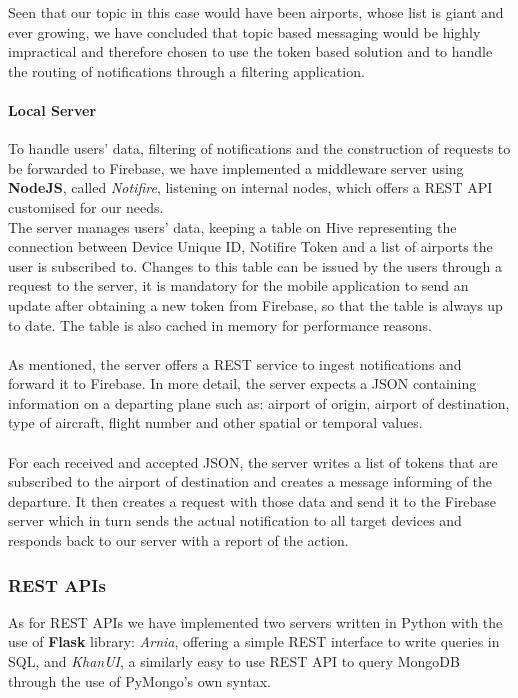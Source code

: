 Seen that our topic in this case would have been airports, whose list is giant and ever growing, we have concluded that topic based messaging would be highly impractical and therefore chosen to use the token based solution and to handle the routing of notifications through a filtering application.

\paragraph{Local Server}
To handle users' data, filtering of notifications and the construction of requests to be forwarded to Firebase, we have implemented a middleware server using \textbf{NodeJS}, called \textit{Notifire}, listening on internal nodes, which offers a REST API customised for our needs.
\\
The server manages users' data, keeping a table on Hive representing the connection between Device Unique ID, Notifire Token and a list of airports the user is subscribed to. Changes to this table can be issued by the users through a request to the server, it is mandatory for the mobile application to send an update after obtaining a new token from Firebase, so that the table is always up to date.
The table is also cached in memory for performance reasons.
\\ \\
As mentioned, the server offers a REST service to ingest notifications and forward it to Firebase. In more detail, the server expects a JSON containing information on a departing plane such as: airport of origin, airport of destination, type of aircraft, flight number and other spatial or temporal values.
\\ \\
For each received and accepted JSON, the server writes a list of tokens that are subscribed to the airport of destination and creates a message informing of the departure. It then creates a request with those data and send it to the Firebase server which in turn sends the actual notification to all target devices and responds back to our server with a report of the action.

\subsubsection{REST APIs}
As for REST APIs we have implemented two servers written in Python with the use of \textbf{Flask} library: \textit{Arnia}, offering a simple REST interface to write queries in SQL, and \textit{KhanUI}, a similarly easy to use REST API to query MongoDB through the use of PyMongo's own syntax.

